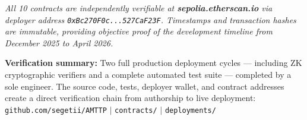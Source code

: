 \documentclass[11pt,a4paper]{article}
\begin{document}
\vspace{0.2cm}
\noindent\textit{All 10 contracts are independently verifiable at \textbf{sepolia.etherscan.io} via deployer address \texttt{0xBc270F0c...527CaF23F}. Timestamps and transaction hashes are immutable, providing objective proof of the development timeline from December 2025 to April 2026.}

\vspace{0.3cm}
\noindent\textbf{Verification summary:} Two full production deployment cycles --- including ZK cryptographic verifiers and a complete automated test suite --- completed by a sole engineer. The source code, tests, deployer wallet, and contract addresses create a direct verification chain from authorship to live deployment: \texttt{github.com/segetii/AMTTP} $\mid$ \texttt{contracts/} $\mid$ \texttt{deployments/}
\end{document}
